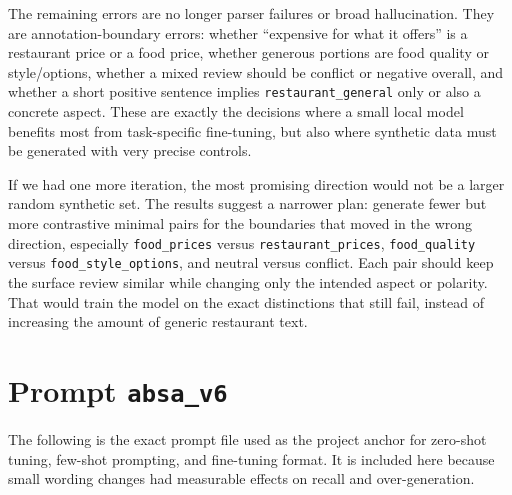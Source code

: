 \documentclass[11pt,a4paper]{article}
\newcommand{\code}[1]{\texttt{#1}}
\begin{document}
The remaining errors are no longer parser failures or broad hallucination. They are annotation-boundary errors: whether ``expensive for what it offers'' is a restaurant price or a food price, whether generous portions are food quality or style/options, whether a mixed review should be conflict or negative overall, and whether a short positive sentence implies \code{restaurant\_general} only or also a concrete aspect. These are exactly the decisions where a small local model benefits most from task-specific fine-tuning, but also where synthetic data must be generated with very precise controls.

If we had one more iteration, the most promising direction would not be a larger random synthetic set. The results suggest a narrower plan: generate fewer but more contrastive minimal pairs for the boundaries that moved in the wrong direction, especially \code{food\_prices} versus \code{restaurant\_prices}, \code{food\_quality} versus \code{food\_style\_options}, and neutral versus conflict. Each pair should keep the surface review similar while changing only the intended aspect or polarity. That would train the model on the exact distinctions that still fail, instead of increasing the amount of generic restaurant text.

\appendix
\section{Prompt \code{absa\_v6}}
\label{appendix:prompt_v6}

The following is the exact prompt file used as the project anchor for zero-shot tuning, few-shot prompting, and fine-tuning format. It is included here because small wording changes had measurable effects on recall and over-generation.

\end{document}
